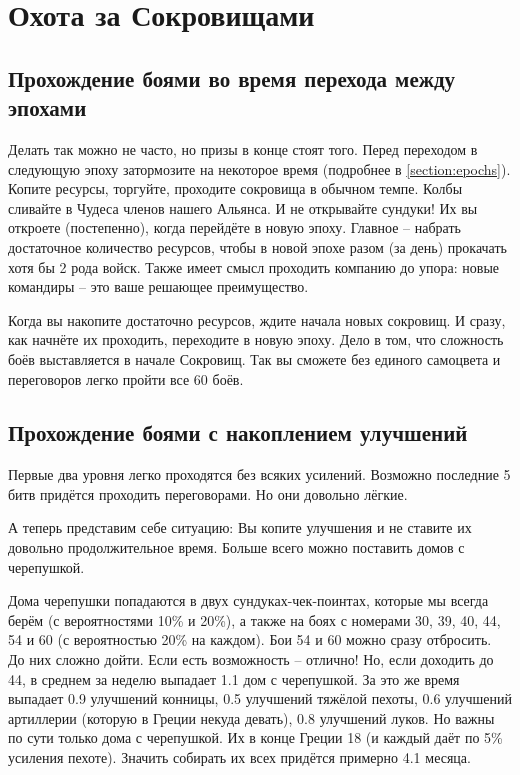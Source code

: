 \section{Охота за Сокровищами} 

\subsection{Прохождение боями во время перехода между эпохами}
\label{subsection:treasure_between_epochs}

Делать так можно не часто, но призы в конце стоят того. 
Перед переходом в следующую эпоху затормозите на некоторое время (подробнее в \ref{section:epochs}). 
Копите ресурсы, торгуйте, проходите сокровища в обычном темпе. 
Колбы сливайте в Чудеса членов нашего Альянса.
И не открывайте сундуки! Их вы откроете (постепенно), когда перейдёте в новую эпоху. 
Главное -- набрать достаточное количество ресурсов, чтобы в новой эпохе разом (за день) прокачать хотя бы 2 рода войск. 
Также имеет смысл проходить компанию до упора: новые командиры -- это ваше решающее преимущество.

Когда вы накопите достаточно ресурсов, ждите начала новых сокровищ. 
И сразу, как начнёте их проходить, переходите в новую эпоху.
Дело в том, что сложность боёв выставляется в начале Сокровищ.
Так вы сможете без единого самоцвета и переговоров легко пройти все 60 боёв.

\subsection{Прохождение боями с накоплением улучшений}

Первые два уровня легко проходятся без всяких усилений.
Возможно последние 5 битв придётся проходить переговорами.
Но они довольно лёгкие.

А теперь представим себе ситуацию: Вы копите улучшения и не ставите их
довольно продолжительное время. Больше всего можно поставить домов с
черепушкой.

Дома черепушки попадаются в двух сундуках-чек-поинтах, которые мы всегда берём (с вероятностями 10\% и 20\%),
а также на боях с номерами 30, 39, 40, 44, 54 и 60 (с вероятностью 20\% на каждом).
Бои 54 и 60 можно сразу отбросить. До них сложно дойти. Если есть возможность -- отлично!
Но, если доходить до 44, в среднем за неделю выпадает 1.1 дом с черепушкой.
За это же время выпадает 0.9 улучшений конницы,
0.5 улучшений тяжёлой пехоты,
0.6 улучшений артиллерии (которую в Греции некуда девать),
0.8 улучшений луков.
Но важны по сути только дома с черепушкой. Их в конце Греции 18 (и каждый даёт по 5\% усиления пехоте).
Значить собирать их всех придётся примерно 4.1 месяца.

